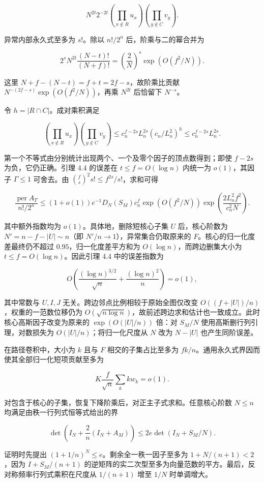 \documentclass[11pt,a4paper]{article}
\begin{document}
\[
N^{2t}2^{-2t}
\left(\prod_{x\notin R}u_x\right)
\left(\prod_{y\notin C}v_y\right).
\]

异常内部永久式至多为 \(s!\)。除以 \(n!/2^n\) 后，阶乘与二的幂合并为

\[
2^sN^{2t}\frac{(N-t)!}{(N+f)!}
=\left(\frac2N\right)^s\exp(O(f^2/N)).
\]

这里 \(N+f-(N-t)=f+t=2f-s\)，故阶乘比贡献 \(N^{-(2f-s)}\exp(O(f^2/N))\)，再乘 \(N^{2t}\) 后恰留下 \(N^{-s}\)。

令 \(h=|R\cap C|\)。成对乘积满足

\[
\left(\prod_{x\notin R}u_x\right)
\left(\prod_{y\notin C}v_y\right)
\le c_n^{f-2s}L_n^{2s}(c_n/L_n^2)^h
\le c_n^{f-2s}L_n^{2s}.
\]

第一个不等式由分别统计出现两个、一个及零个因子的顶点数得到；即使 \(f-2s\) 为负，它仍正确。引理 4.4 的误差在 \(t\le f=O(\log n)\) 内统一为 \(o(1)\)，其因子 \(\Gamma\le1\) 可舍去。由 \(\binom fs^2s!\le f^{2s}/s!\)，求和可得

\[
\frac{\operatorname{per}A_T}{n!/2^n}
\le(1+o(1))e^{-1}D_N(S_M)c_n^f
\exp(O(f^2/N))
\exp\left(\frac{2L_n^2f^2}{c_n^2N}\right).
\]

其中额外指数均为 \(o(1)\)。具体地，删除短核心子集 \(U\) 后，核心阶数为 \(N'=n-f-|U|\sim n\)（即 \(N'/n\to1\)），异常集合仍取原来的 \(F\)。核心的归一化度差最终仍不超过 \(0.95\)，归一化度差平方和为 \(O(\log n)\)，而跨边删集大小为 \(t\le f=O(\log n)\)。因此引理 4.4 中的误差指数为

\[
O\!\left(\frac{(\log n)^{3/2}}{\sqrt n}+\frac{(\log n)^2}{n}\right)=o(1),
\]

其中常数与 \(U,I,J\) 无关。跨边邻点比例相较于原始全图仅改变 \(O((f+|U|)/n)\)，权重的一范数位移仍为 \(O(\sqrt{n\log n})\)，故前述跨边求和估计也一致成立。此时核心高斯因子改变为原来的 \(\exp(O(|U|/n))\) 倍：对 \(S_M/N\) 使用高斯删行列引理，对数损失为 \(O(|U|/n)\)；将归一化尺度从 \(N\) 改为 \(N-|U|\) 也产生同阶误差。

在路径卷积中，大小为 \(k\) 且与 \(F\) 相交的子集占比至多为 \(fk/n\)。通用永久式界因而使其全部归一化短项贡献至多为

\[
K\frac f{\sqrt n}\sum_k kw_k=o(1).
\]

对包含于核心的子集，恢复下降阶乘后，对正主子式求和。任意核心阶数 \(N\le n\) 均满足由秩一行列式恒等式给出的界

\[
\det\left(I_N+\frac2n(I_N+A_M)\right)
\le2e\det(I_N+S_M/N).
\]

证明时先提出 \((1+1/n)^N\le e\)。剩余全一秩一因子至多为 \(1+N/(n+1)<2\)，因为 \(I+S_M/(n+1)\) 的逆矩阵的实二次型至多为向量范数的平方。最后，反对称频率行列式乘积在尺度从 \(1/(n+1)\) 增至 \(1/N\) 时单调增大。
\end{document}
